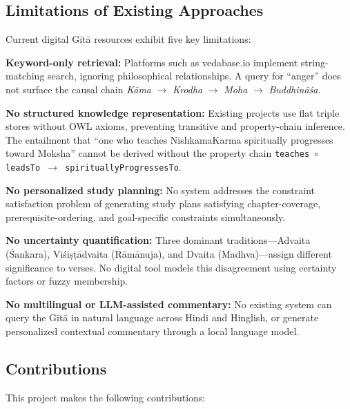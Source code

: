 \documentclass[conference]{IEEEtran}
\begin{document}
\subsection{Limitations of Existing Approaches}

Current digital G\={i}t\={a} resources exhibit five key limitations:

\textbf{Keyword-only retrieval:} Platforms such as vedabase.io implement
string-matching search, ignoring philosophical relationships. A query for
``anger'' does not surface the causal chain
\textit{K\={a}ma} $\to$ \textit{Krodha} $\to$ \textit{Moha}
$\to$ \textit{Buddhin\={a}\'{s}a}.

\textbf{No structured knowledge representation:} Existing projects use flat
triple stores without OWL axioms, preventing transitive and property-chain
inference. The entailment that ``one who teaches NishkamaKarma spiritually
progresses toward Moksha'' cannot be derived without the property chain
\texttt{teaches $\circ$ leadsTo $\to$ spirituallyProgressesTo}.

\textbf{No personalized study planning:} No system addresses the constraint
satisfaction problem of generating study plans satisfying chapter-coverage,
prerequisite-ordering, and goal-specific constraints simultaneously.

\textbf{No uncertainty quantification:} Three dominant traditions—Advaita
(\'Sankara), Vi\'si\d{s}\d{t}\={a}dvaita (R\={a}m\={a}nuja), and Dvaita
(Madhva)—assign different significance to verses. No digital tool models this
disagreement using certainty factors or fuzzy membership.

\textbf{No multilingual or LLM-assisted commentary:} No existing system can
query the G\={i}t\={a} in natural language across Hindi and Hinglish, or
generate personalized contextual commentary through a local language model.

\subsection{Contributions}

This project makes the following contributions:
\end{document}

